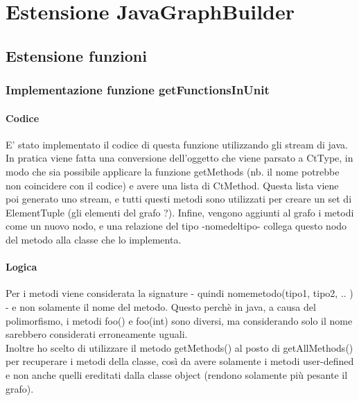 \section{Estensione JavaGraphBuilder}

\subsection{Estensione funzioni}

\subsubsection*{Implementazione funzione getFunctionsInUnit}
\paragraph{Codice}
E' stato implementato il codice di questa funzione utilizzando gli stream di java. \\
In pratica viene fatta una conversione dell'oggetto che viene parsato a CtType, in modo che sia possibile applicare la funzione getMethods (nb. il nome potrebbe non coincidere con il codice) e avere una lista di CtMethod. Questa lista viene poi generato uno stream, e tutti questi metodi sono utilizzati per creare un set di ElementTuple (gli elementi del grafo ?). Infine, vengono aggiunti al grafo i metodi come un nuovo nodo, e una relazione del tipo -nomedeltipo- collega questo nodo del metodo alla classe che lo implementa.
\paragraph{Logica}
Per i metodi viene considerata la signature - quindi nomemetodo(tipo1, tipo2, .. ) - e non solamente il nome del metodo. Questo perchè in java, a causa del polimorfismo, i metodi foo() e foo(int) sono diversi, ma considerando solo il nome sarebbero considerati erroneamente uguali. \\
Inoltre ho scelto di utilizzare il metodo getMethods() al posto di getAllMethods() per recuperare i metodi della classe, così da avere solamente i metodi user-defined e non anche quelli ereditati dalla classe object (rendono solamente più pesante il grafo).
